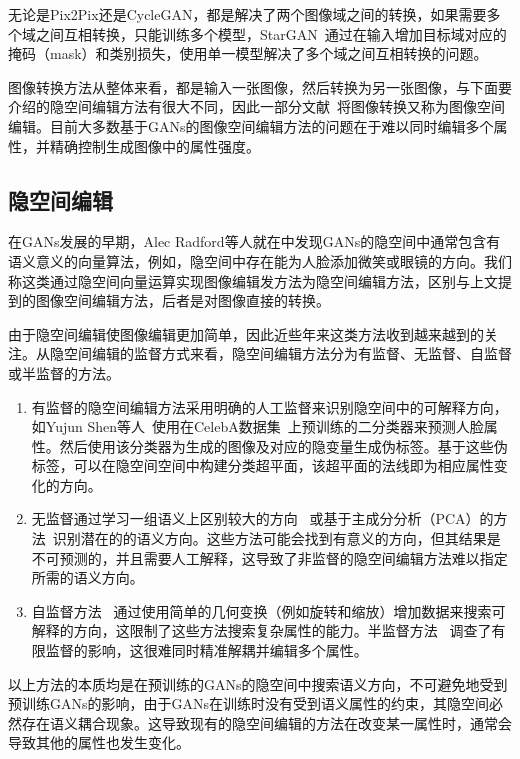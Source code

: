 无论是Pix2Pix还是CycleGAN，都是解决了两个图像域之间的转换，如果需要多个域之间互相转换，只能训练多个模型，StarGAN~\cite{stargan}通过在输入增加目标域对应的掩码（mask）和类别损失，使用单一模型解决了多个域之间互相转换的问题。

图像转换方法从整体来看，都是输入一张图像，然后转换为另一张图像，与下面要介绍的隐空间编辑方法有很大不同，因此一部分文献~\cite{iclr2021}将图像转换又称为图像空间编辑。目前大多数基于GANs的图像空间编辑方法的问题在于难以同时编辑多个属性，并精确控制生成图像中的属性强度。

\subsection{隐空间编辑}

在GANs发展的早期，Alec Radford等人就在\cite{DCGAN}中发现GANs的隐空间中通常包含有语义意义的向量算法，例如，隐空间中存在能为人脸添加微笑或眼镜的方向。我们称这类通过隐空间向量运算实现图像编辑发方法为隐空间编辑方法，区别与上文提到的图像空间编辑方法，后者是对图像直接的转换。

由于隐空间编辑使图像编辑更加简单，因此近些年来这类方法收到越来越到的关注。从隐空间编辑的监督方式来看，隐空间编辑方法分为有监督、无监督、自监督或半监督的方法。

\begin{enumerate}
\item 有监督的隐空间编辑方法采用明确的人工监督来识别隐空间中的可解释方向，如Yujun Shen等人~\cite{interfacegan}使用在CelebA数据集~\cite{celeba}上预训练的二分类器来预测人脸属性。然后使用该分类器为生成的图像及对应的隐变量生成伪标签。基于这些伪标签，可以在隐空间空间中构建分类超平面，该超平面的法线即为相应属性变化的方向。

\item 无监督通过学习一组语义上区别较大的方向~\cite{icml2020} 或基于主成分分析（PCA）的方法~\cite{harkonen2020ganspace}识别潜在的的语义方向。这些方法可能会找到有意义的方向，但其结果是不可预测的，并且需要人工解释，这导致了非监督的隐空间编辑方法难以指定所需的语义方向。

\item 自监督方法~\cite{steer,variation} 通过使用简单的几何变换（例如旋转和缩放）增加数据来搜索可解释的方向，这限制了这些方法搜索复杂属性的能力。半监督方法~\cite{nie2020semi} 调查了有限监督的影响，这很难同时精准解耦并编辑多个属性。
\end{enumerate}

以上方法的本质均是在预训练的GANs的隐空间中搜索语义方向，不可避免地受到预训练GANs的影响，由于GANs在训练时没有受到语义属性的约束，其隐空间必然存在语义耦合现象。这导致现有的隐空间编辑的方法在改变某一属性时，通常会导致其他的属性也发生变化。    

